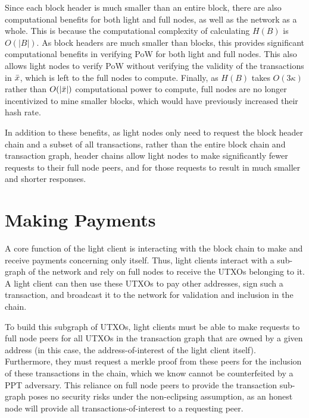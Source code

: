 Since each block header is much smaller than an entire block, there are also computational benefits for both light and full nodes, as well as the network as a whole. This is because the computational complexity of calculating $H(B)$ is $O(|B|)$. As block headers are much smaller than blocks, this provides significant computational benefits in verifying PoW for both light and full nodes. This also allows light nodes to verify PoW without verifying the validity of the transactions in $\Bar{x}$, which is left to the full nodes to compute. Finally, as $H(B)$ takes $O(3\kappa)$ rather than $O(|\Bar{x}|)$ computational power to compute, full nodes are no longer incentivized to mine smaller blocks, which would have previously increased their hash rate.

In addition to these benefits, as light nodes only need to request the block header chain and a subset of all transactions, rather than the entire block chain and transaction graph, header chains allow light nodes to make significantly fewer requests to their full node peers, and for those requests to result in much smaller and shorter responses.


\section{Making Payments}
A core function of the light client is interacting with the block chain to make and receive payments concerning only itself. Thus, light clients interact with a sub-graph of the network and rely on full nodes to receive the UTXOs belonging to it. A light client can then use these UTXOs to pay other addresses, sign such a transaction, and broadcast it to the network for validation and inclusion in the chain.

To build this subgraph of UTXOs, light clients must be able to make requests to full node peers for all UTXOs in the transaction graph that are owned by a given address (in this case, the address-of-interest of the light client itself). Furthermore, they must request a merkle proof from these peers for the inclusion of these transactions in the chain, which we know cannot be counterfeited by a PPT adversary. This reliance on full node peers to provide the transaction sub-graph poses no security risks under the non-eclipsing assumption, as an honest node will provide all transactions-of-interest to a requesting peer.


